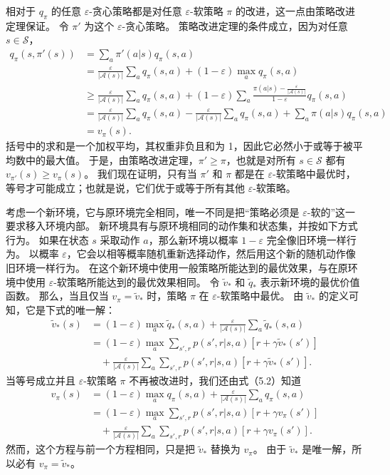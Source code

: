 \documentclass[UTF8,12pt,a4paper,fontset=fandol]{ctexart}
\begin{document}
相对于 $q_\pi$ 的任意 $\varepsilon$-贪心策略都是对任意 $\varepsilon$-软策略 $\pi$ 的改进，这一点由策略改进定理保证。
令 $\pi'$ 为这个 $\varepsilon$-贪心策略。
策略改进定理的条件成立，因为对任意 $s\in\mathcal{S}$，
\begin{equation}
\begin{aligned}
q_\pi(s,\pi'(s))
&= \sum_a \pi'(a|s)q_\pi(s,a)\\
&= \frac{\varepsilon}{|\mathcal{A}(s)|}\sum_a q_\pi(s,a)
 +(1-\varepsilon)\max_a q_\pi(s,a)\\
&\ge
\frac{\varepsilon}{|\mathcal{A}(s)|}\sum_a q_\pi(s,a)
 +(1-\varepsilon)\sum_a
\frac{\pi(a|s)-\frac{\varepsilon}{|\mathcal{A}(s)|}}{1-\varepsilon}
 q_\pi(s,a)\\
&= \frac{\varepsilon}{|\mathcal{A}(s)|}\sum_a q_\pi(s,a)
- \frac{\varepsilon}{|\mathcal{A}(s)|}\sum_a q_\pi(s,a)
+ \sum_a \pi(a|s)q_\pi(s,a)\\
&= v_\pi(s).
\end{aligned}
\end{equation}
括号中的求和是一个加权平均，其权重非负且和为 1，因此它必然小于或等于被平均数中的最大值。
于是，由策略改进定理，$\pi'\ge \pi$，也就是对所有 $s\in\mathcal{S}$ 都有 $v_{\pi'}(s)\ge v_\pi(s)$。
我们现在证明，只有当 $\pi'$ 和 $\pi$ 都是在 $\varepsilon$-软策略中最优时，等号才可能成立；也就是说，它们优于或等于所有其他 $\varepsilon$-软策略。

考虑一个新环境，它与原环境完全相同，唯一不同是把“策略必须是 $\varepsilon$-软的”这一要求移入环境内部。
新环境具有与原环境相同的动作集和状态集，并按如下方式行为。
如果在状态 $s$ 采取动作 $a$，那么新环境以概率 $1-\varepsilon$ 完全像旧环境一样行为。
以概率 $\varepsilon$，它会以相等概率随机重新选择动作，然后用这个新的随机动作像旧环境一样行为。
在这个新环境中使用一般策略所能达到的最优效果，与在原环境中使用 $\varepsilon$-软策略所能达到的最优效果相同。
令 $\tilde v_*$ 和 $\tilde q_*$ 表示新环境的最优价值函数。
那么，当且仅当 $v_\pi=\tilde v_*$ 时，策略 $\pi$ 在 $\varepsilon$-软策略中最优。
由 $\tilde v_*$ 的定义可知，它是下式的唯一解：
\[
\begin{aligned}
\tilde v_*(s)
&= (1-\varepsilon)\max_a \tilde q_*(s,a)
 + \frac{\varepsilon}{|\mathcal{A}(s)|}\sum_a \tilde q_*(s,a)\\
&= (1-\varepsilon)\max_a \sum_{s',r}p(s',r|s,a)\left[r+\gamma\tilde v_*(s')\right]\\
&\quad + \frac{\varepsilon}{|\mathcal{A}(s)|}\sum_a\sum_{s',r}
p(s',r|s,a)\left[r+\gamma\tilde v_*(s')\right].
\end{aligned}
\]
当等号成立并且 $\varepsilon$-软策略 $\pi$ 不再被改进时，我们还由式（5.2）知道
\[
\begin{aligned}
v_\pi(s)
&= (1-\varepsilon)\max_a q_\pi(s,a)
 + \frac{\varepsilon}{|\mathcal{A}(s)|}\sum_a q_\pi(s,a)\\
&= (1-\varepsilon)\max_a \sum_{s',r}p(s',r|s,a)\left[r+\gamma v_\pi(s')\right]\\
&\quad + \frac{\varepsilon}{|\mathcal{A}(s)|}\sum_a\sum_{s',r}
p(s',r|s,a)\left[r+\gamma v_\pi(s')\right].
\end{aligned}
\]
然而，这个方程与前一个方程相同，只是把 $\tilde v_*$ 替换为 $v_\pi$。
由于 $\tilde v_*$ 是唯一解，所以必有 $v_\pi=\tilde v_*$。
\end{document}
